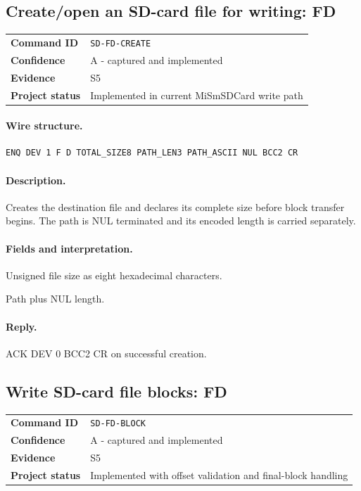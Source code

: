 \documentclass[10pt,letterpaper]{article}
\begin{document}
\subsection{Create/open an SD-card file for writing: FD}
\begin{tabularx}{\textwidth}{@{}>{\bfseries}p{2.8cm}X@{}}
Command ID & \texttt{SD-FD-CREATE} \\
Confidence & A - captured and implemented \\
Evidence & S5 \\
Project status & Implemented in current MiSmSDCard write path \\
\end{tabularx}
\vspace{0.35em}
\paragraph{Wire structure.}
\begin{Verbatim}[breaklines=true,breakanywhere=true,fontsize=\small]
ENQ DEV 1 F D TOTAL_SIZE8 PATH_LEN3 PATH_ASCII NUL BCC2 CR
\end{Verbatim}
\paragraph{Description.} Creates the destination file and declares its complete size before block transfer begins. The path is NUL terminated and its encoded length is carried separately.
\paragraph{Fields and interpretation.}
\begin{description}[style=nextline,leftmargin=3.2cm,labelwidth=3.0cm,font=\normalfont\bfseries]
\item[TOTAL\_SIZE8] Unsigned file size as eight hexadecimal characters.
\item[PATH\_LEN3] Path plus NUL length.
\end{description}
\paragraph{Reply.} ACK DEV 0 BCC2 CR on successful creation.

\subsection{Write SD-card file blocks: FD}
\begin{tabularx}{\textwidth}{@{}>{\bfseries}p{2.8cm}X@{}}
Command ID & \texttt{SD-FD-BLOCK} \\
Confidence & A - captured and implemented \\
Evidence & S5 \\
Project status & Implemented with offset validation and final-block handling \\
\end{tabularx}
\vspace{0.35em}
\end{document}
